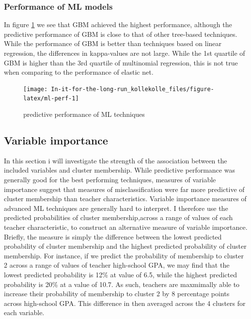 \documentclass[
]{article}
\begin{document}
\hypertarget{performance-of-ml-models}{%
\subsubsection{Performance of ML models}\label{performance-of-ml-models}}

In figure \ref{fig:ml-perf} we see that GBM achieved the highest performance, although the predictive performance of GBM is close to that of other tree-based techniques. While the performance of GBM is better than techniques based on linear regression, the differences in kappa-values are not large. While the 1st quartile of GBM is higher than the 3rd quartile of multinomial regression, this is not true when comparing to the performance of elastic net.

\begin{figure}[H]
\texttt{[image: In-it-for-the-long-run\_kollekolle\_files/figure-latex/ml-perf-1]} \caption{predictive performance of ML techniques}\label{fig:ml-perf}
\end{figure}

\hypertarget{variable-importance}{%
\subsection{Variable importance}\label{variable-importance}}

In this section i will investigate the strength of the association between the included variables and cluster membership. While predictive performance was generally good for the best performing techniques, measures of variable importance suggest that measures of misclassification were far more predictive of cluster membership than teacher characteristics. Variable importance measures of advanced ML techniques are generally hard to interpret. I therefore use the predicted probabilities of cluster membership,across a range of values of each teacher characteristic, to construct an alternative measure of variable importance. Briefly, the measure is simply the difference between the lowest predicted probability of cluster membership and the highest predicted probability of cluster membership. For instance, if we predict the probability of membership to cluster 2 across a range of values of teacher high-school GPA, we may find that the lowest predicted probability is 12\% at value of 6.5, while the highest predicted probability is 20\% at a value of 10.7. As such, teachers are maxmimally able to increase their probability of membership to cluster 2 by 8 percentage points across high-school GPA. This difference in then averaged across the 4 clusters for each variable.
\end{document}
